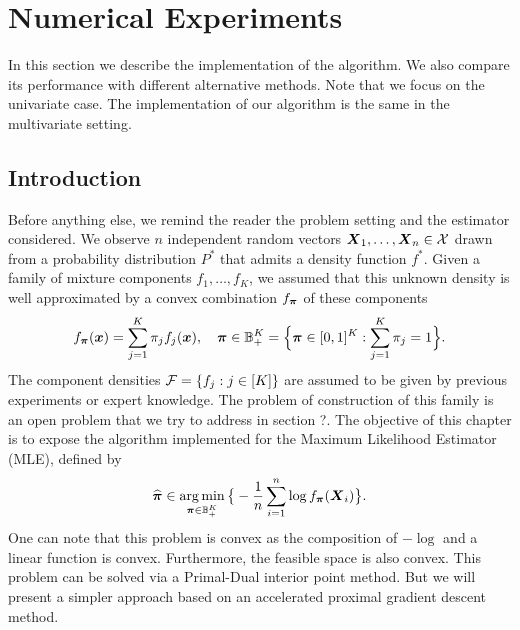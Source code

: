 
\chapter{Numerical Experiments}

In this section we describe the implementation of the algorithm. We also compare its performance with different alternative methods. Note that we focus on the univariate case. The implementation of our algorithm is the same in the multivariate setting.

\section{Introduction}
Before anything else, we remind the reader the problem setting and the estimator considered. We observe $n$ independent random vectors $\boldsymbol X_1,\ldots,\boldsymbol X_n\in\mathcal X$ drawn from a probability distribution $P^*$ that admits a density function $f^*$. Given a family of mixture components $f_1,\ldots,f_K$, we assumed that this unknown density is well approximated by a convex combination $f_{\boldsymbol \pi}$ of these components
\begin{equation}
f_{\boldsymbol \pi}(\boldsymbol x)=\sum_{j=1}^K\pi_j f_j(\boldsymbol x), \quad \boldsymbol \pi \in {\mathbb B}_+^K=\Big\{\boldsymbol \pi\in [0,1]^K: \sum_{j=1}^K\pi_j=1\Big\}.
\end{equation}
The component densities $\mathcal F=\{f_j:j\in[K]\}$ are assumed to be given by previous experiments or expert knowledge. The problem of construction of this family is an open problem that we try to address in section ?. The objective of this chapter is to expose the algorithm implemented for the Maximum Likelihood Estimator (MLE), defined by
\begin{equation}
\label{MLE_2}
\widehat{\boldsymbol \pi} \in \operatorname*{arg\,min}_{\boldsymbol \pi\in {\mathbb B}_+^K}\big\{-\frac{1}{n}\sum_{i=1}^n\log f_{\boldsymbol \pi}(\boldsymbol X_i)\big\}.
\end{equation}
One can note that this problem is convex as the composition of $-\log$ and a linear function is convex. Furthermore, the feasible space is also convex. This problem can be solved via a Primal-Dual interior point method. But we will present a simpler approach based on an accelerated proximal gradient descent method.
